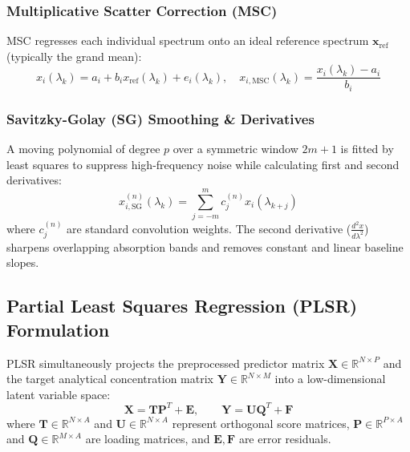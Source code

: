 \documentclass[9pt,twocolumn,a4paper,landscape]{article}
\begin{document}
\subsubsection{Multiplicative Scatter Correction (MSC)}
MSC regresses each individual spectrum onto an ideal reference spectrum $\mathbf{x}_{\text{ref}}$ (typically the grand mean):
\begin{equation}
    x_i(\lambda_k) = a_i + b_i x_{\text{ref}}(\lambda_k) + e_i(\lambda_k), \quad x_{i, \text{MSC}}(\lambda_k) = \frac{x_i(\lambda_k) - a_i}{b_i}
    \label{eq:msc}
\end{equation}

\subsubsection{Savitzky-Golay (SG) Smoothing \& Derivatives}
A moving polynomial of degree $p$ over a symmetric window $2m+1$ is fitted by least squares to suppress high-frequency noise while calculating first and second derivatives:
\begin{equation}
    x_{i, \text{SG}}^{(n)}(\lambda_k) = \sum_{j=-m}^{m} c_j^{(n)} x_i(\lambda_{k+j})
    \label{eq:sg}
\end{equation}
where $c_j^{(n)}$ are standard convolution weights. The second derivative ($\frac{d^2 x}{d\lambda^2}$) sharpens overlapping absorption bands and removes constant and linear baseline slopes.

\subsection{Partial Least Squares Regression (PLSR) Formulation}
PLSR simultaneously projects the preprocessed predictor matrix $\mathbf{X} \in \mathbb{R}^{N \times P}$ and the target analytical concentration matrix $\mathbf{Y} \in \mathbb{R}^{N \times M}$ into a low-dimensional latent variable space:
\begin{equation}
    \mathbf{X} = \mathbf{T} \mathbf{P}^T + \mathbf{E}, \qquad \mathbf{Y} = \mathbf{U} \mathbf{Q}^T + \mathbf{F}
    \label{eq:plsr_decomp}
\end{equation}
where $\mathbf{T} \in \mathbb{R}^{N \times A}$ and $\mathbf{U} \in \mathbb{R}^{N \times A}$ represent orthogonal score matrices, $\mathbf{P} \in \mathbb{R}^{P \times A}$ and $\mathbf{Q} \in \mathbb{R}^{M \times A}$ are loading matrices, and $\mathbf{E}, \mathbf{F}$ are error residuals.
\end{document}
